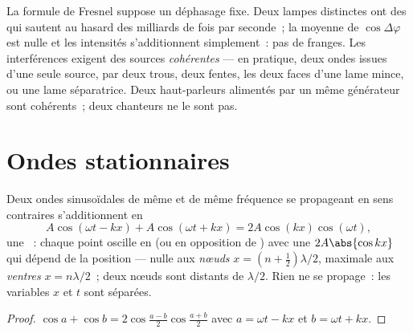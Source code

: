 \begin{remark}[Cohérence]\label{rem:b1:wave-propagation:coherence}
La formule de Fresnel suppose un déphasage fixe. Deux lampes distinctes
ont des  qui sautent au hasard des milliards de fois par seconde~;
la moyenne de $\cos\Delta\varphi$ est nulle et les intensités
s'additionnent simplement~: pas de franges. Les interférences exigent
des sources \emph{cohérentes} --- en pratique, deux ondes issues d'une
seule source, par deux trous, deux fentes, les deux faces d'une lame
mince, ou une lame séparatrice. Deux haut-parleurs alimentés par un même
générateur sont cohérents~; deux chanteurs ne le sont pas.
\end{remark}

\section{Ondes stationnaires}

\begin{theorem}\label{thm:b1:wave-propagation:standing}
Deux ondes sinusoïdales de même  et de même fréquence se
propageant en sens contraires s'additionnent en
\[
A\cos(\omega t - kx) + A\cos(\omega t + kx) = 2A\cos(kx)\cos(\omega t),
\]
une \emph{}~: chaque point oscille en  (ou en
opposition de ) avec une  $2A\abs{\cos kx}$ qui dépend de
la position --- nulle aux \emph{nœuds} $x = (n + \tfrac12)\lambda/2$,
maximale aux \emph{ventres} $x = n\lambda/2$~; deux nœuds sont distants
de $\lambda/2$. Rien ne se propage~: les variables $x$ et $t$ sont
séparées.
\end{theorem}

\begin{proof}
$\cos a + \cos b = 2\cos\frac{a - b}{2}\cos\frac{a + b}{2}$ avec
$a = \omega t - kx$ et $b = \omega t + kx$.
\end{proof}

